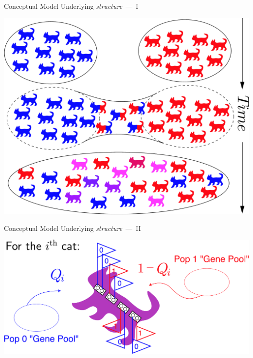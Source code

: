 \documentclass[letter,graphicx]{beamer}
\begin{document}
\begin{frame}{Conceptual Model Underlying {\em structure}~---~I}

\begin{center}
\includegraphics*[width=.75\textwidth]{../figures/admixture_cats.pdf}
\end{center}
\end{frame}






\begin{frame}{Conceptual Model Underlying {\em structure}~---~II}
\begin{center}
\includegraphics*[width=\textwidth]{../figures/admix_cat_flags.pdf}
\end{center}
\end{frame}
\end{document}

